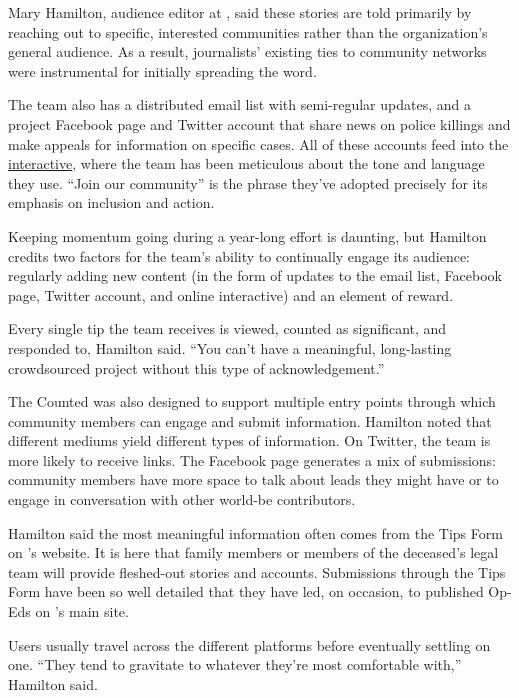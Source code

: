 \begin{itemize}
\begin{itemize}
\begin{enumerate}
{Mary Hamilton, audience editor at , said these stories are told primarily by reaching out to specific, interested communities rather than the organization’s general audience.\autocite{Hamilton} As a result, journalists’ existing ties to community networks were instrumental for initially spreading the word.

The team also has a distributed email list with semi-regular updates, and a project Facebook page and Twitter account that share news on police killings and make appeals for information on specific cases. All of these accounts feed into the \href{http://www.theguardian.com/us-news/ng-interactive/2015/jun/01/the-counted-police-killings-us-database}{interactive},\autocite{MPExpense} where the team has been meticulous about the tone and language they use. ``Join our community'' is the phrase they’ve adopted precisely for its emphasis on inclusion and action. 

Keeping momentum going during a year-long effort is daunting, but Hamilton credits two factors for the team’s ability to continually engage its audience: regularly adding new content (in the form of updates to the email list, Facebook page, Twitter account, and online interactive) and an element of reward. 

Every single tip the team receives is viewed, counted as significant, and responded to, Hamilton said. ``You can’t have a meaningful, long-lasting crowdsourced project without this type of acknowledgement.''

The Counted was also designed to support multiple entry points through which community members can engage and submit information.
Hamilton noted that different mediums yield different types of information. On Twitter, the team is more likely to receive links. The Facebook page generates a mix of submissions: community members have more space to talk about leads they might have or to engage in conversation with other world-be contributors.

Hamilton said the most meaningful information often comes from the Tips Form on ’s website. It is here that family members or members of the deceased’s legal team will provide fleshed-out stories and accounts. Submissions through the Tips Form have been so well detailed that they have led, on occasion, to published Op-Eds on ’s main site.

Users usually travel across the different platforms before eventually settling on one. ``They tend to gravitate to whatever they’re most comfortable with,'' Hamilton said.

}
\end{enumerate}
\end{itemize}
\end{itemize}
